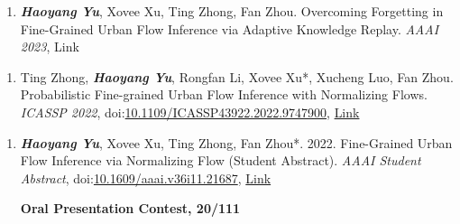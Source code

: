 
\begin{enumerate}[resume]
    \item  \textit{\textbf{Haoyang Yu}}, Xovee Xu, Ting Zhong, Fan Zhou. Overcoming Forgetting in Fine-Grained Urban Flow Inference via Adaptive Knowledge Replay. \textit{AAAI 2023}, 
     {\color{Green}Link}

\end{enumerate}


\begin{enumerate}[resume]
    \item Ting Zhong, \textit{\textbf{Haoyang Yu}}, Rongfan Li, Xovee Xu*, Xucheng Luo, Fan Zhou. Probabilistic Fine-grained Urban Flow Inference with Normalizing Flows. \textit{ICASSP 2022}, doi:\href{papers/ICASSP_2022_FUFI.pdf}{10.1109/ICASSP43922.2022.9747900}, \href{https://ieeexplore.ieee.org/document/9747900
    }{\color{Green}Link}

\end{enumerate}


\begin{enumerate}[resume]
    \item \textit{\textbf{Haoyang Yu}}, Xovee Xu, Ting Zhong, Fan Zhou*. 2022. Fine-Grained Urban Flow Inference via Normalizing Flow (Student Abstract). \textit{AAAI Student Abstract}, doi:\href{https://doi.org/10.1609/aaai.v36i11.21687}{10.1609/aaai.v36i11.21687}, \href{https://ojs.aaai.org/index.php/AAAI/article/view/21687}{\color{Green}Link}

    \textbf{\color{red}Oral Presentation Contest, 20/111}
\end{enumerate}